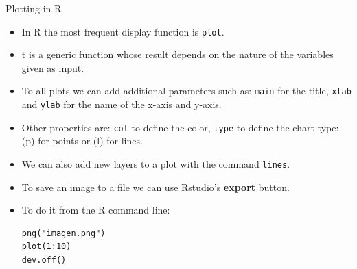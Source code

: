 \documentclass[handout]{beamer}
\begin{document}
\begin{frame}[fragile]{Plotting in R}
\scriptsize{
\begin{itemize}
 \item  In R the most frequent display function is \verb+plot+. 
 \item t is a generic function whose result depends on the nature of the variables given as input.  
 
 \item  To all plots we can add additional parameters such as: \verb+main+ for the title, \verb+xlab+ and \verb+ylab+ for the name of the x-axis and y-axis.
 
 \item Other properties are: \verb+col+ to define the color, \verb+type+ to define the chart type: (p) for points or (l) for lines.
 
 \item We can also add new layers to a plot with the command \verb+lines+.
 
 \item To save an image to a file we can use Rstudio's \textbf{export} button.
 
 \item To do it from the R command line:
 \begin{verbatim}
png("imagen.png")
plot(1:10)
dev.off() 
 \end{verbatim}

 


 
 
\end{itemize}


 
} 
\end{frame}
\end{document}
